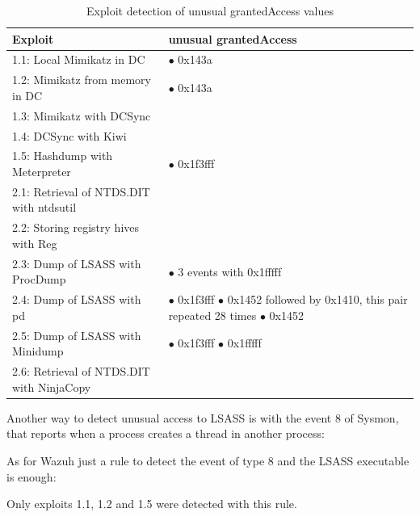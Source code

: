 \begin{table}[H]
	\begin{tabularx}{\textwidth}{|l|X|}
		\hline
		\rowcolor{gray!30}
		Exploit & unusual grantedAccess\\ \hline
		1.1: Local Mimikatz in DC& \cellcolor{green!60}$\bullet$ 0x143a\\ \hline
		1.2: Mimikatz from memory in DC& \cellcolor{green!60} $\bullet$ 0x143a\\ \hline
		1.3: Mimikatz with DCSync& \cellcolor{red!60}\\ \hline
		1.4: DCSync with Kiwi& \cellcolor{red!60}\\ \hline
		1.5: Hashdump with Meterpreter& \cellcolor{green!60}$\bullet$ 0x1f3fff\\ \hline
		2.1: Retrieval of NTDS.DIT with ntdsutil& \cellcolor{red!60}\\ \hline
		2.2: Storing registry hives with Reg& \cellcolor{red!60}\\ \hline
		2.3: Dump of LSASS with ProcDump& \cellcolor{green!60}$\bullet$ 3 events with 0x1fffff\\ \hline
		2.4: Dump of LSASS with pd& \cellcolor{green!60}
			$\bullet$ 0x1f3fff \linej
			$\bullet$ 0x1452 followed by 0x1410, this pair repeated 28 times \linej
			$\bullet$ 0x1452 \\ \hline
		2.5: Dump of LSASS with Minidump& \cellcolor{green!60}
			$\bullet$ 0x1f3fff \linej
			$\bullet$ 0x1fffff \\ \hline
		2.6: Retrieval of NTDS.DIT with NinjaCopy& \cellcolor{red!60}\\ \hline
	\end{tabularx}
	\caption{Exploit detection of unusual grantedAccess values}
\end{table}
\linej
Another way to detect unusual access to LSASS is with the event 8 of Sysmon\cite{detection_events}, that reports when a process creates a thread in another process:

\linej
As for Wazuh just a rule to detect the event of type 8 and the LSASS executable is enough:

\linej
Only exploits 1.1, 1.2 and 1.5 were detected with this rule.

